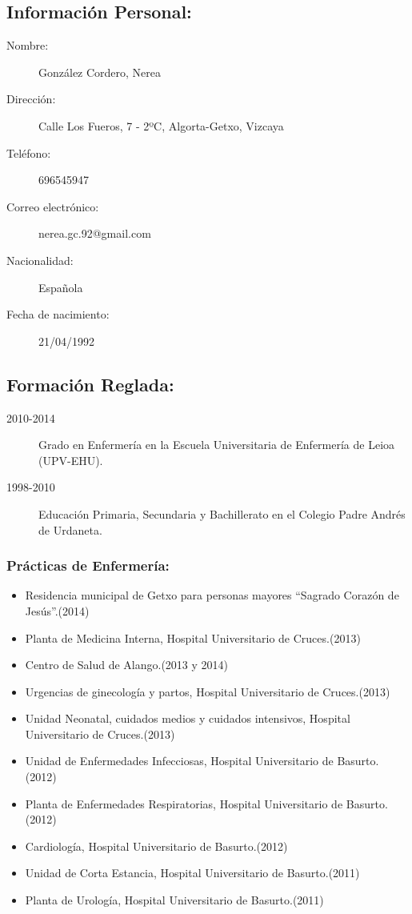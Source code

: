 \documentclass[10pt,a4paper,notitlepage]{article}
\begin{document}
\subsection*{Información Personal:}
\begin{description}
  \item[Nombre:] González Cordero, Nerea
  \item[Dirección:] Calle Los Fueros, 7 - 2ºC, Algorta-Getxo, Vizcaya
  \item[Teléfono:] 696545947
  \item[Correo electrónico:] nerea.gc.92@gmail.com
  \item[Nacionalidad:] Española
  \item[Fecha de nacimiento:] 21/04/1992
\end{description}

\subsection*{Formación Reglada:}
\begin{description}
  \item[2010-2014] Grado en Enfermería en la Escuela Universitaria de Enfermería de Leioa (UPV-EHU).
\end{description}
\begin{description}
  \item[1998-2010] Educación Primaria, Secundaria y Bachillerato en el Colegio Padre Andrés de Urdaneta.
\end{description}

\subsubsection*{Prácticas de Enfermería:}
\begin{itemize}
  \item Residencia municipal de Getxo para personas mayores ``Sagrado Corazón de Jesús''.(2014)
  \item Planta de Medicina Interna, Hospital Universitario de Cruces.(2013)
  \item Centro de Salud de Alango.(2013 y 2014)
  \item Urgencias de ginecología y partos, Hospital Universitario de Cruces.(2013)
  \item Unidad Neonatal, cuidados medios y cuidados intensivos, Hospital Universitario de Cruces.(2013)
  \item Unidad de Enfermedades Infecciosas, Hospital Universitario de Basurto.(2012)
  \item Planta de Enfermedades Respiratorias, Hospital Universitario de Basurto.(2012)
  \item Cardiología, Hospital Universitario de Basurto.(2012)
  \item Unidad de Corta Estancia, Hospital Universitario de Basurto.(2011)
  \item Planta de Urología, Hospital Universitario de Basurto.(2011) 
\end{itemize}
\end{document}
